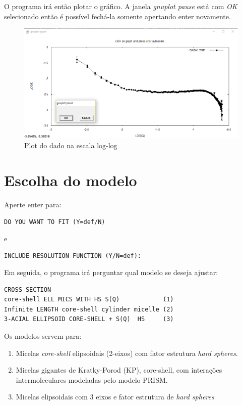 \begin{apendicesenv}
O programa irá então plotar o gráfico. A janela \emph{gnuplot pause} está com \emph{OK} selecionado então é possível fechá-la somente apertando enter novamente.

\begin{figure}[h]
	\includegraphics[scale=0.5]{./imagens/saxs/supersaxs_gnuplot}
	\centering
	\caption{Plot do dado na escala log-log}
	\centering
\end{figure}

\section{Escolha do modelo}

Aperte enter para:

\texttt{DO YOU WANT TO FIT (Y=def/N)}

e

\texttt{INCLUDE RESOLUTION FUNCTION (Y/N=def):}

Em seguida, o programa irá perguntar qual modelo se deseja ajustar:

\begin{verbatim}
CROSS SECTION
core-shell ELL MICS WITH HS S(Q)            (1)
Infinite LENGTH core-shell cylinder micelle (2)
3-ACIAL ELLIPSOID CORE-SHELL + S(Q)  HS     (3)
\end{verbatim}

Os modelos servem para:

\begin{enumerate}
	\item Micelas \emph{core-shell} elipsoidais (2-eixos) com fator estrutura \emph{hard spheres}.
	\item Micelas gigantes de Kratky-Porod (KP), core-shell, com interações intermoleculares modeladas pelo modelo PRISM.
	\item Micelas elipsoidais com 3 eixos e fator estrutura de \emph{hard spheres}
\end{enumerate}


\end{apendicesenv}
